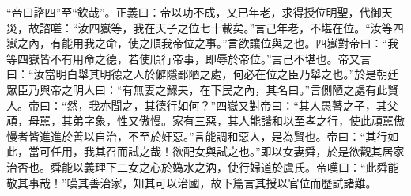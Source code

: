 {\noindent\shu{}\fzkt “帝曰諮四”至“欽哉”。正義曰：帝以功不成，又已年老，求得授位明聖，代御天災，故諮嗟：“汝四嶽等，我在天子之位七十載矣。”言己年老，不堪在位。“汝等四嶽之內，有能用我之命，使之順我帝位之事。”言欲讓位與之也。四嶽對帝曰：“我等四嶽皆不有用命之德，若使順行帝事，即辱於帝位。”言己不堪也。帝又言曰：“汝當明白舉其明德之人於僻隱鄙陋之處，何必在位之臣乃舉之也。”於是朝廷眾臣乃與帝之明人曰：“有無妻之鰥夫，在下民之內，其名曰。”言側陋之處有此賢人。帝曰：“然，我亦聞之，其德行如何？”四嶽又對帝曰：“其人愚瞽之子，其父頑，母嚚，其弟字象，性又傲慢。家有三惡，其人能諧和以至孝之行，使此頑嚚傲慢者皆進進於善以自治，不至於奸惡。”言能調和惡人，是為賢也。帝曰：“其行如此，當可任用，我其召而試之哉！欲配女與試之也。”即以女妻舜，於是欲觀其居家治否也。舜能以義理下二女之心於媯水之汭，使行婦道於虞氏。帝嘆曰：“此舜能敬其事哉！”嘆其善治家，知其可以治國，故下篇言其授以官位而歷試諸難。 \par}


